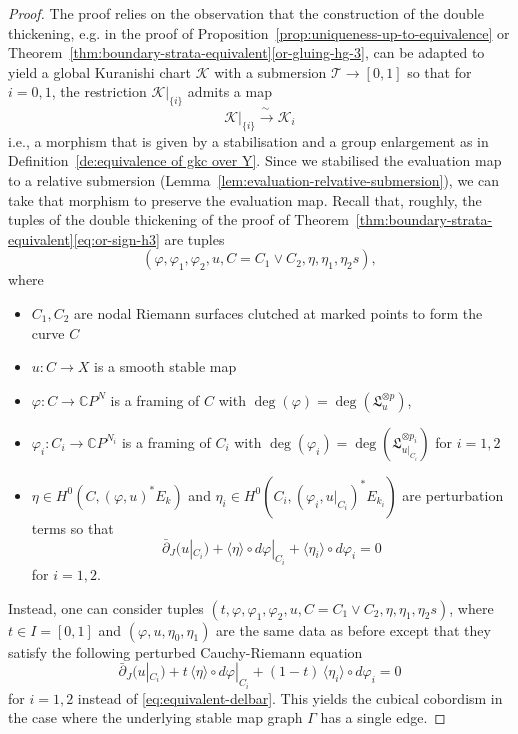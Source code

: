 \documentclass[11pt,psamsfonts, oneside, reqno]{amsart}
\newcommand{\g}{\circ}%
\newcommand{\cl}{\colon}
\newcommand{\lspan}[1]{\langle {#1}\rangle}
\newcommand{\delbar}{\bar\partial}
\newcommand{\bC}{\mathbb{C}}
\newcommand{\cK}{\mathcal{K}}
\newcommand{\cT}{\mathcal{T}}
\newcommand{\fL}{\mathfrak{L}}
\theoremstyle{definition}
\theoremstyle{remark}
\numberwithin{equation}{section}
\begin{document}
\begin{proof} 
	 The proof relies on the observation that the construction of the double thickening, e.g. in the proof of Proposition~\ref{prop:uniqueness-up-to-equivalence} or Theorem~\ref{thm:boundary-strata-equivalent}\eqref{or-gluing-hg-3}, can be adapted to yield a global Kuranishi chart $\cK $ with a submersion $\cT\to [0,1]$ so that for $i = 0,1$, the restriction $\cK|_{\{i\}}$ admits a map 
	\begin{equation}\label{} \cK|_{\{i\}}\stackrel{\sim\;}{\to} \cK_i\end{equation}
	i.e., a morphism that is given by a stabilisation and a group enlargement as in Definition~\ref{de:equivalence of gkc over Y}. Since we stabilised the evaluation map to a relative submersion (Lemma~\ref{lem:evaluation-relvative-submersion}), we can take that morphism to preserve the evaluation map.
	Recall that, roughly, the tuples of the double thickening of the proof of Theorem~\ref{thm:boundary-strata-equivalent}\eqref{eq:or-sign-h3} are tuples \[(\varphi,\varphi_1,\varphi_2,u,C = C_1\vee C_2,\eta,\eta_1,\eta_2s),\]
	where 
	\begin{itemize}
		\item $C_1,C_2$ are nodal Riemann surfaces clutched at marked points to form the curve $C$
		\item $u \cl C\to X$ is a smooth stable map 
		\item $\varphi \cl C\to \bC P^N$ is a framing of $C$ with $\deg(\varphi) = \deg(\fL_u^{\otimes p})$,
		\item $\varphi_i \cl C_i \to \bC P^{N_i}$ is a framing of $C_i$ with $\deg(\varphi_i) = \deg(\fL_{u|_{C_i}}^{\otimes p_i})$ for $i = 1,2$
		\item $\eta \in H^0(C,(\varphi,u)^*E_k)$ and $\eta_i \in H^0(C_i,(\varphi_i,u|_{C_i})^*E_{k_i})$ are perturbation terms so that 
		\begin{equation}\label{eq:equivalent-delbar} \delbar_J(u|_{C_i}) +\lspan{\eta}\g d\varphi|_{C_i} + \lspan{\eta_i}\g d\varphi_i  = 0\end{equation}
		for $i = 1,2$.
	\end{itemize}
	Instead, one can consider tuples $(t,\varphi,\varphi_1,\varphi_2,u,C = C_1\vee C_2,\eta,\eta_1,\eta_2s)$, where $t\in I = [0,1]$ and $(\varphi,u,\eta_0,\eta_1)$ are the same data as before except that they satisfy the following perturbed Cauchy-Riemann equation
	\begin{equation}\label{eq:cobordism-delbar} 
		\delbar_J (u|_{C_i}) + t\,\lspan{\eta}\g d\varphi|_{C_i} + (1-t)\,\lspan{\eta_i}\g d\varphi_i = 0
	\end{equation}
	for $i = 1,2$ instead of \eqref{eq:equivalent-delbar}. This yields the cubical cobordism in the case where the underlying stable map graph $\Gamma$ has a single edge.
	 

\end{proof}
\end{document}
